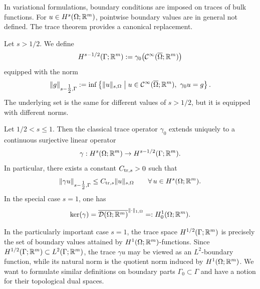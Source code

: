 In variational formulations, boundary conditions are imposed on traces of bulk functions. For $u\in H^s(\Omega;{\mathbb R}^m)$, pointwise boundary values are in general not defined. The trace theorem provides a canonical replacement.

\begin{definition}\label{def:boundary_sobolev}
	Let $s>1/2$. We define
	\begin{equation*}
		H^{s-1/2}(\Gamma;{\mathbb R}^m):=\gamma_0\big({\mathcal C}^\infty(\overline{\Omega};{\mathbb R}^m)\big)
	\end{equation*}
	equipped with the norm
	\begin{equation*}
		\|g\|_{s-\tfrac12,\Gamma}
		:=
		\inf\left\{
		\|u\|_{s,\Omega}
		\;\middle|\;
		u\in {\mathcal C}^\infty(\overline{\Omega};{\mathbb R}^m),\ \gamma_0 u=g
		\right\}.
	\end{equation*}
	The underlying set is the same for different values of $s>1/2$, but it is equipped with different norms.
\end{definition}
\begin{theorem}\label{thm:trace}
	Let $1/2< s\le 1$. Then the classical trace operator $\gamma_0$ extends uniquely to a continuous surjective linear operator
	\begin{equation*}
		\gamma:H^s(\Omega;{\mathbb R}^m)\to H^{s-1/2}(\Gamma;{\mathbb R}^m).
	\end{equation*}
	In particular, there exists a constant $C_{{\mathrm{tr}},s}>0$ such that
	\begin{equation*}
		\|\gamma u\|_{s-\tfrac12,\Gamma}\le C_{{\mathrm{tr}},s}\|u\|_{s,\Omega}
		\qquad\forall\,u\in H^s(\Omega;{\mathbb R}^m).
	\end{equation*}
	In the special case $s=1$, one has
	\begin{equation*}
		\ker(\gamma)=\overline{{\mathcal D}(\Omega;{\mathbb R}^m)}^{\|\cdot\|_{1,\Omega}}=:H_0^1(\Omega;{\mathbb R}^m).
	\end{equation*}
\end{theorem}
In the particularly important case $s=1$, the trace space $H^{1/2}(\Gamma;{\mathbb R}^m)$ is precisely the set of boundary values attained by $H^1(\Omega;{\mathbb R}^m)$-functions. Since $H^{1/2}(\Gamma;{\mathbb R}^m)\subset L^2(\Gamma;{\mathbb R}^m)$, the trace $\gamma u$ may be viewed as an $L^2$-boundary function, while its natural norm is the quotient norm induced by $H^1(\Omega;{\mathbb R}^m)$.  We want to formulate similar definitions on boundary parts $\Gamma_0\subset\Gamma$ and have a notion for their topological dual spaces.

